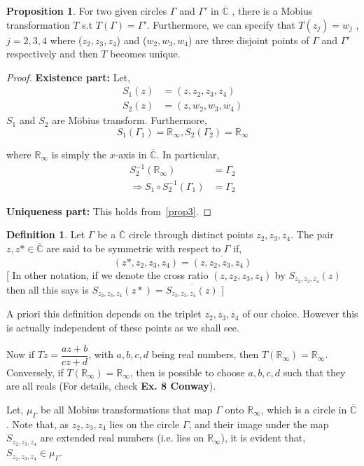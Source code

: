 \documentclass[12pt]{article}
\newcommand{\Rinf}{\mathbb{R}_{\infty}}
\newcommand{\C}{\mathbb{C}}
\newcommand{\Cinf}{\overline{\C}}
\theoremstyle{definition}
\newtheorem{defn}{Definition}
\newtheorem{prop}{Proposition}
\newenvironment{definition}{
\begin{tcolorbox}[colback=green!5!white,colframe=green!75!black, parbox = false]\begin{defn} }{\end{defn}\end{tcolorbox} }
\newenvironment{proposition}{
\begin{tcolorbox}[colback=green!5!white,colframe=green!75!black, parbox = false]\begin{prop} }{\end{prop}\end{tcolorbox} }
\begin{document}
\begin{proposition}
    For two given circles $\Gamma$ and $\Gamma'$ in $\Cinf$ , there is a Mobius transformation $T$ s.t $T(\Gamma)=\Gamma'$. Furthermore, we can specify that $T(z_j)=w_j$ , $j=2,3,4$ where ($z_2, z_3, z_4$) and ($w_2, w_3, w_4$) are three disjoint points of $\Gamma$ and $\Gamma'$ respectively and then $T$ becomes unique.
\end{proposition}
\begin{proof}
\textbf{Existence part:}
    Let, 
    \begin{align*}
        S_{1}(z)&=(z,z_2,z_3,z_4)\\
        S_{2}(z)&=(z,w_2,w_3,w_4)
    \end{align*}
    $S_1$ and $S_2$ are M{\"o}bius transform. Furthermore,
    $$ S_1(\Gamma_1)=\mathbb{R}_\infty, S_2(\Gamma_2)=\mathbb{R}_\infty $$

    where $\Rinf$ is simply the $x$-axis in $\Cinf$. In particular,
    \begin{align*}
        S_2^{-1}(\mathbb{R}_\infty)&=\Gamma_2\\
        \Rightarrow S_1\circ S_2^{-1}(\Gamma_1)&=\Gamma_2
    \end{align*}
    
\textbf{Uniqueness part:}
This holds from~\cref{prop3}.

\end{proof}


\begin{definition}
    Let $\Gamma$ be a $\overline{\C}$ circle through distinct points $z_2,z_3,z_4$. The pair $z,z*\in \overline{\C}$ are said to be symmetric with respect to $\Gamma$ if,
    $$(z*,z_2,z_3,z_4)=\overline{(z,z_2,z_3,z_4)}$$
    [ In other notation, if we denote the cross ratio $(z,z_2,z_3,z_4)$ by $S_{z_2,z_3,z_4}(z)$ then all this says is $S_{z_2,z_3,z_4}(z*)=\overline{S_{z_2,z_3,z_4}(z)}$ ]
\end{definition}

A priori this definition depends on the triplet $z_2, z_3, z_4$ of our choice. However this is actually independent of these points as we shall see.

Now if $Tz = \dfrac{az + b}{cz + d}$, with $a, b, c, d$ being real numbers, then $T(\Rinf) = \Rinf$. Conversely, if $T(\Rinf) = \Rinf$, then is possible to choose $a, b, c, d$ such that they are all reals (For details, check \textbf{Ex. 8 Conway}).

Let, $\mu_{\Gamma}$ be all Mobius transformations that map $\Gamma$ onto $\Rinf$, which is a circle in $\Cinf$. Note that, as $z_2, z_3, z_4$ lies on the circle $\Gamma$, and their image under the map $S_{z_2, z_3, z_4}$ are extended real numbers (i.e. lies on $\Rinf$), it is evident that, $S_{z_2, z_3, z_4} \in \mu_\Gamma$. 
\end{document}
